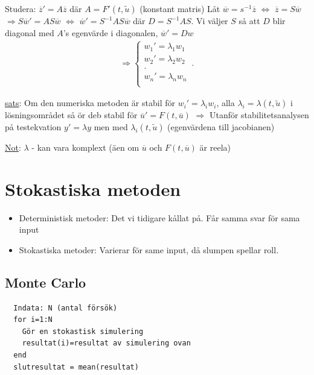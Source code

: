 Studera: $\overline{z}'=A\overline{z}$ där $A=F'(t,\tilde{u})$ (konstant matris)
Låt $\overline{w}=s^{-1}\overline{z}$ $\Leftrightarrow$ $\overline{z}=S\overline{w}$
$\Rightarrow S\overline{w}'= AS\overline{w}$ $\Leftrightarrow$ $\overline{w}'=S^{-1}AS\overline{w}$
där $D=S^{-1}AS$. Vi väljer $S$ så att $D$ blir diagonal med $A$'s egenvärde i diagonalen,
$\overline{w}'=Dw$
\begin{align*}
\Rightarrow 
\begin{cases}
  w_1'=\lambda_1w_1\\
  w_2'=\lambda_2w_2\\
  .\\
  w_n'=\lambda_nw_n\\
\end{cases}\,.
\end{align*}

\underline{sats}: Om den numeriska metoden är stabil för $w_i'=\lambda_iw_i$, alla $\lambda_i=\lambda(t,\tilde{u})$
i lösningsområdet så ör deb stabil för $\overline{u}'=F(t,\overline{u})$
$\Rightarrow$ Utanför stabilitetsanalysen på testekvation $y'=\lambda y$ men med $\lambda_i(t,\tilde{u})$
(egenvärdena till jacobianen)

\underline{Not}: $\lambda$ - kan vara komplext (äen om $\overline{u}$ och $F(t,\overline{u})$ är reela)


\newpage
\section{Stokastiska metoden}
\begin{itemize}
  \item Deterministisk metoder: Det vi tidigare kållat på. Får samma svar för sama input
  \item Stokastiska metoder: Varierar för same input, då slumpen spellar roll.
\end{itemize}

\subsection{Monte Carlo}
\begin{verbatim}
  Indata: N (antal försök)
  for i=1:N
    Gör en stokastisk simulering
    resultat(i)=resultat av simulering ovan
  end 
  slutresultat = mean(resultat)
\end{verbatim}


